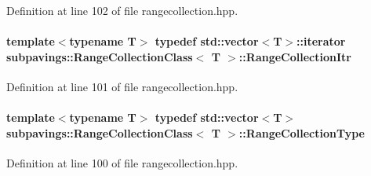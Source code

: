 \-Definition at line 102 of file rangecollection.\-hpp.

\hypertarget{classsubpavings_1_1RangeCollectionClass_afc18b2f0242b0fc4314bbf8af2cc7034}{
\paragraph[{\-Range\-Collection\-Itr}]{\setlength{\rightskip}{0pt plus 5cm}template$<$typename \-T$>$ typedef std\-::vector$<$\-T$>$\-::iterator {\bf subpavings\-::\-Range\-Collection\-Class}$<$ \-T $>$\-::{\bf \-Range\-Collection\-Itr}}}\label{classsubpavings_1_1RangeCollectionClass_afc18b2f0242b0fc4314bbf8af2cc7034}


\-Definition at line 101 of file rangecollection.\-hpp.

\hypertarget{classsubpavings_1_1RangeCollectionClass_aad6b97397ee955fe4ed74e1d8dc0776a}{
\paragraph[{\-Range\-Collection\-Type}]{\setlength{\rightskip}{0pt plus 5cm}template$<$typename \-T$>$ typedef std\-::vector$<$\-T$>$ {\bf subpavings\-::\-Range\-Collection\-Class}$<$ \-T $>$\-::{\bf \-Range\-Collection\-Type}}}\label{classsubpavings_1_1RangeCollectionClass_aad6b97397ee955fe4ed74e1d8dc0776a}


\-Definition at line 100 of file rangecollection.\-hpp.



